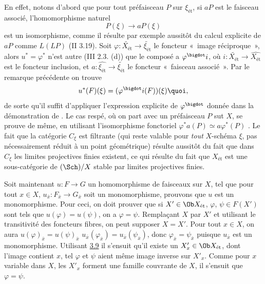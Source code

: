 \documentclass[10pt]{../fichiers-configuration-latex/smfart}
\begin{document}
En effet, notons d'abord que pour tout préfaisceau $P$ sur
$\xi_{\text{ét}}$,
si $aP$ est le faisceau associé, l'homomorphisme naturel
$$
P(\xi) \to aP(\xi)
$$
est un isomorphisme, comme il résulte par exemple aussitôt du
calcul explicite de\pageoriginale  $aP$ comme $L(LP)$ (II 3.19). Soit
$\varphi :
\widetilde{X_{\text{ét}}} \to \widetilde{\xi_{\text{ét}}}$ le foncteur « image réciproque », alors $u^{\ast} = \varphi^{\ast}$ n'est autre
(III 2.3. (d)) que le composé a $\varphi^{\bigdot} i$, où $i :
\widetilde{X_{\text{ét}}} \to \widehat{X_{\text{ét}}}$
est le foncteur inclusion, et $a :
\widehat{\xi_{\text{ét}}} \to
\widetilde{\xi_{\text{ét}}}$ le foncteur « faisceau
associé ». Par le remarque précédente on trouve
$$
u^{\ast} (F) (\xi) = (\varphi^{\bigdot} i(F)) (\xi){\quoi},
$$
de sorte qu'il suffit d'appliquer l'expression explicite de
$\varphi^{\bigdot}$ donnée dans la démonstration de . %
Le cas respé, où on part avec un préfaisceau $P$ sut $X$, se prouve de même, en
utilisant l'isomorphisme fonctoriel $\varphi^{\ast} a(P) \simeq a
\varphi^{\ast} (P)$ . %
Le fait que la catégorie $C_{\xi}$ est filtrante (qui reste valable pour \emph{tout} $X$-schéma $\xi$, pas
nécessairement réduit à un point géométrique)
résulte aussitôt du
fait que dans $C_{\xi}$ les limites projectives finies existent, ce
qui résulte du fait que $X_{\text{ét}}$ est une sous-catégorie de
$(\Sch) /X$ stable par limites projectives finies.

Soit maintenant $u : F \to G$ un homomorphisme de faisceaux sur $X$,
tel que pour tout $x \in X$, $u_{\bar{x}} : F_{\bar{x}} \to
G_{\bar{x}}$ soit un monomorphisme, prouvons que $u$ est un
monomorphisme. Pour ceci, on doit prouver que si $X'\in \Ob
X_{\text{ét}}$, $\varphi$, $\psi \in F(X')$ sont tels que $u
(\varphi) = u (\psi)$, on a $\varphi = \psi$. Remplaçant $X$ par
$X'$ et utilisant le transitivité des foncteurs fibres, on peut
supposer $X = X'$. Pour tout $x \in X$, on aura $u
(\varphi)_{\bar{x}} = u (\psi)_{\bar{x}}$ \ie $u_{\bar{x}}
(\varphi_{\bar{x}}) = u_{\bar{x}} (\psi_{\bar{x}})$, donc
$\varphi_{\bar{x}} = \psi_{\bar{x}}$ puisque $u_{\bar{x}}$ est un
monomorphisme. Utilisant \hyperref[VIII.prop3.9]{3.9} %
il s'ensuit qu'il existe un $X'_x \in \Ob X_{\text{ét}}$, dont l'image contient $x$, tel
$\varphi$ et $\psi$ aient même image inverse sur $X'_x$. Comme pour
$x$ variable dans $X$, les $X'_x$ forment une famille couvrante de
$X$, il s'ensuit que $\varphi = \psi$.
\end{document}
